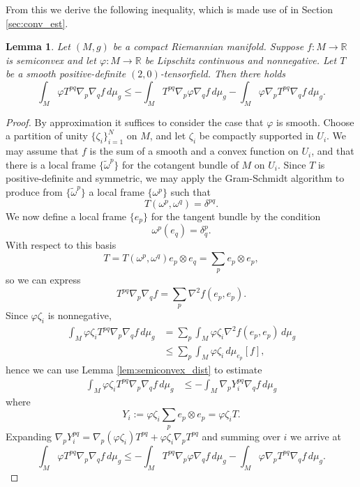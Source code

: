 \documentclass[12pt]{amsart}
\newtheorem{lemma}[theorem]{Lemma}
\begin{document}
{From this we derive the following inequality, which is made use of in Section \ref{sec:conv_est}.

\begin{lemma}
Let $(M,g)$ be a compact Riemannian manifold. Suppose $f : M \to \mathbb{R}$ is semiconvex and let $\varphi: M\to \mathbb{R}$ be Lipschitz continuous and nonnegative. Let $T$ be a smooth positive-definite $(2,0)$-tensorfield. Then there holds 
\[\int_M \varphi T^{pq} \nabla_p \nabla_q f \, d\mu_g \leq - \int_M T^{pq} \nabla_p \varphi \nabla_q f \, d\mu_g - \int_M \varphi \nabla_p T^{pq} \nabla_q f\,d\mu_g.\]
\end{lemma}

\begin{proof}
By approximation it suffices to consider the case that $\varphi$ is smooth. Choose a partition of unity $\{\zeta_i\}_{i=1}^N$ on $M$, and let $\zeta_i$ be compactly supported in $U_i$. We may assume that $f$ is the sum of a smooth and a convex function on $U_i$, and that there is a local frame $\{\tilde \omega^p\}$ for the cotangent bundle of $M$ on $U_i$. Since $T$ is positive-definite and symmetric, we may apply the Gram-Schmidt algorithm to produce from $\{\tilde \omega^p\}$ a local frame $\{ \omega^p\}$ such that 
\[T(\omega^p, \omega^q) = \delta^{pq}.\]
We now define a local frame $\{ e_p\}$ for the tangent bundle by the condition
\[ \omega^p(  e_q) = \delta^p_q.\]
With respect to this basis 
\[T = T(\omega^p,  \omega^q)  e_p \otimes  e_q = \sum_p  e_p \otimes  e_p,\]
so we can express
\[T^{pq} \nabla_p \nabla_q f = \sum_p \nabla^2 f(e_p ,  e_p).\]
Since $\varphi \zeta_i$ is nonnegative,
\begin{align*}
\int_{M} \varphi \zeta_i T^{pq} \nabla_p \nabla_q f\, d\mu_g &= \sum_p \int_M \varphi \zeta_i \nabla^2 f ( e_p,  e_p)\, d\mu_g\\
&\leq \sum_p \int_M \varphi \zeta_i  \, d\mu_{e_p}[f],
\end{align*}
hence we can use Lemma \ref{lem:semiconvex_dist} to estimate
\begin{align*}
\int_{M} \varphi \zeta_i T^{pq} \nabla_p \nabla_q f\, d\mu_g &\leq   -\int_M \nabla_p Y_i^{pq} \nabla_q f\, d\mu_g
\end{align*}
where
\[Y_i := \varphi \zeta_i \sum_p  e_p \otimes  e_p  = \varphi \zeta_i T.\]
Expanding $\nabla_p Y_i^{pq} = \nabla_p(\varphi \zeta_i) T^{pq} + \varphi \zeta_i \nabla_p T^{pq}$ and summing over $i$ we arrive at 
\[\int_M \varphi T^{pq} \nabla_p \nabla_q f\, d\mu_g \leq - \int_M T^{pq} \nabla_p \varphi \nabla_q f\,d\mu_g - \int_M \varphi \nabla_pT^{pq} \nabla_q f\, d\mu_g.\]
\end{proof}
}




\end{document}
